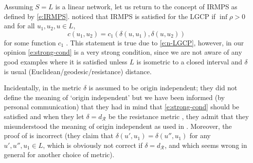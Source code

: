 \documentclass[alpha-refs]{wiley-article}
\begin{document}
%
%

Assuming $S=L$ is a linear network, let us return to the concept of IRMPS as defined by \eqref{e:IRMPS}. \citet{CronieEtAl} noticed that IRMPS is satisfied  for the LGCP if $\inf\rho>0$ and for all $u_1,u_2,u\in L$, %
\begin{equation}\label{e:strong-cond}
c(u_1,u_2)=c_1(\delta(u,u_1),\delta(u,u_2))
\end{equation} 
for some function $c_1$ \citep[in our notation; see][Equation (29)]{CronieEtAl}. This statement is true due to \eqref{e:n-LGCP}, however, in our opinion \eqref{e:strong-cond} is a very strong condition, since we are not aware of any good examples where it is satisfied unless $L$ is isometric to a closed interval and $\delta$ is usual (Euclidean/geodesic/resistance) distance. 

Incidentally, in \citet[][Lemma 2]{CronieEtAl} the metric $\delta$ is assumed to be origin independent; they did not define the meaning of `origin independent' but we have been informed (by personal communication) that they had in mind that \eqref{e:strong-cond} should be  satisfied and %
when they let $\delta=d_{\mathcal R}$ be the resistance metric \citep[in the text after Lemma 2 in][]{CronieEtAl},
they admit that they misunderstood the meaning of origin independent as used in \citet[][Proposition 2]{AnderesEtAl}. Moreover, 
the proof of \citet[][Lemma 2]{CronieEtAl} is incorrect (they claim that $\delta(u',u_1)=\delta(u'',u_1)$ for any $u',u'',u_1\in L$, which is obviously not correct if $\delta=d_{\mathcal R}$, and which seems wrong in general for another choice of metric). 
\end{document}
